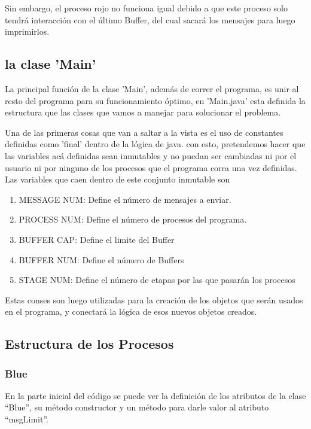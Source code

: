 \documentclass[a4paper]{article}
\begin{document}
    Sin embargo, el proceso rojo no funciona igual debido a que este proceso solo tendrá interacción con el último Buffer, del cual sacará los mensajes para luego imprimirlos. 



    \subsection{la clase 'Main'}

    La principal función de la clase 'Main', además de correr el programa,
    es unir al resto del programa para su funcionamiento óptimo, en 'Main.java'
    esta definida la estructura que las clases que vamos a manejar para solucionar
    el problema.

    Una de las primeras cosas que van a saltar a la vista es el uso de constantes
    definidas como 'final' dentro de la lógica de java. con esto, pretendemos 
    hacer que las variables acá definidas sean inmutables y no puedan ser cambiadas
    ni por el usuario ni por ninguno de los procesos que el programa corra una vez
    definidas. Las variables que caen dentro de este conjunto inmutable son

    \begin{enumerate}
        \item MESSAGE NUM: Define el número de mensajes a enviar.
        \item PROCESS NUM: Define el número de procesos del programa.
        \item BUFFER CAP: Define el limite del Buffer
        \item BUFFER NUM: Define el número de Buffers
        \item STAGE NUM: Define el número de etapas por las que pasarán los procesos
    \end{enumerate}

    Estas conses son luego utilizadas para la creación de los objetos
    que serán usados en el programa, y conectará la lógica de esos
    nuevos objetos creados. 

    \subsection{Estructura de los Procesos}
        \subsubsection{Blue}

        En la parte inicial del código se puede ver la definición de los atributos de la clase “Blue”, su método constructor y un método para darle valor al atributo “msgLimit”. 
        
\end{document}
